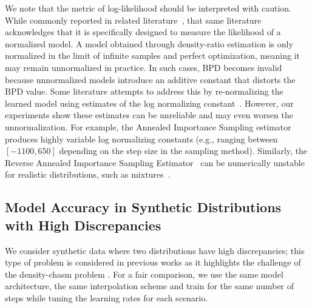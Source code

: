 We note that the metric of log-likelihood should be interpreted with caution. While commonly reported in related literature~\citep{gao2019noiseadaptivence,Rhodes2020,choi2022densityratio,du2023energybasedmodel}, that same literature acknowledges that it is specifically designed to measure the likelihood of a normalized model. A model obtained through density-ratio estimation is only normalized in the limit of infinite samples and perfect optimization, meaning it may remain unnormalized in practice. In such cases, BPD becomes invalid because unnormalized models introduce an additive constant that distorts the BPD value.
Some literature attempts to address this by re-normalizing the learned model using estimates of the log normalizing constant~\citep{gao2019noiseadaptivence,Rhodes2020,choi2022densityratio,du2023energybasedmodel}.
However, our experiments show these estimates can be unreliable and may even worsen the unnormalization. For example, the Annealed Importance Sampling estimator~\citep{neal1998ais} produces highly variable log normalizing constants (e.g., ranging between $[-1100, 650]$ depending on the step size in the sampling method). Similarly, the Reverse Annealed Importance Sampling Estimator~\citep{burda2015raise} can be numerically unstable for realistic distributions, such as mixtures~\citep{du2023energybasedmodel}. 


\subsection{Model Accuracy in Synthetic Distributions with High Discrepancies}

We consider synthetic data where two distributions have high discrepancies; this type of problem is considered in previous works \citep{choi2022densityratio} as it highlights the challenge of the density-chasm problem \citep{Rhodes2020}. For a fair comparison, we use the same model architecture, the same interpolation scheme and train for the same number of steps while tuning the learning rates for each scenario. 

